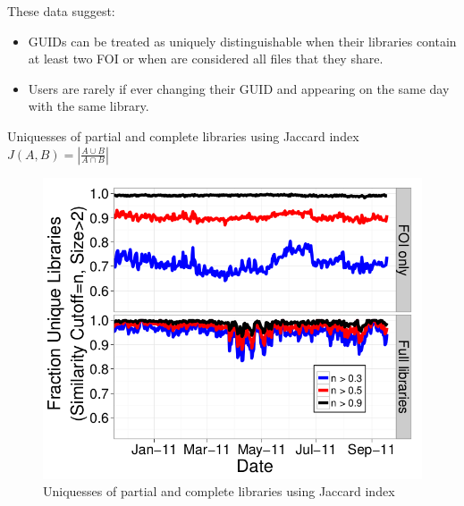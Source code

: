 \documentclass[notes]{beamer}
\begin{document}
\begin{frame}

\begin{block}{These data suggest:}

\begin{itemize}

\item[\checkmark]GUIDs can be treated as uniquely distinguishable when their libraries contain at least two FOI or when are considered all files that they share. 

\item[\checkmark] Users are rarely if ever changing their GUID and appearing on the same day with the same library. 

\end{itemize}

\end{block}

\end{frame}

\begin{frame}

\begin{block}{Uniquesses of partial and complete libraries using Jaccard index $ J(A,B)=\left| \frac{A\cup B} {A\cap B} \right|$}

\begin{figure}[!htb]
\centering
\includegraphics[scale=0.25]{Libraries_unique}
\caption{Uniquesses of partial and complete libraries using Jaccard index}
\label{fig:Libraries_unique}
\end{figure}

\end{block}

\end{frame}
\end{document}
